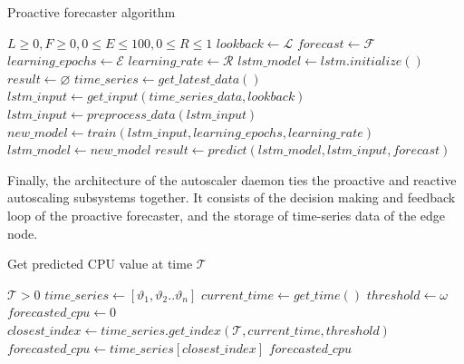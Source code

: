 \begin{algorithm}
    \caption{Proactive forecaster algorithm}
    \label{alg:proactive-forecast-alg}
    \begin{algorithmic}
        \Require $L \geq 0, F \geq 0, 0 \leq E \leq 100, 0 \leq R \leq 1$
        \State $lookback \gets \mathcal{L}$
        \State $forecast \gets \mathcal{F}$
        \State $learning\_epochs \gets \mathcal{E}$
        \State $learning\_rate \gets \mathcal{R}$
        \State $lstm\_model \gets lstm.initialize()$
        \State $result \gets \varnothing$
            \State $time\_series \gets get\_latest\_data()$
            \State $lstm\_input \gets get\_input(time\_series\_data, lookback)$
            \State $lstm\_input \gets preprocess\_data(lstm\_input)$
            \State $new\_model \gets train(lstm\_input, learning\_epochs, learning\_rate)$
                \State $lstm\_model \gets new\_model$
            \EndIf
            \State $result \gets predict(lstm\_model, lstm\_input, forecast)$
            \State {}
        \EndWhile
    \end{algorithmic}
\end{algorithm}

Finally, the architecture of the autoscaler daemon ties the proactive and reactive autoscaling subsystems together. It consists of the decision making and feedback loop of the proactive forecaster, and the storage of time-series data of the edge node.\par

\begin{algorithm}
    \caption{Get predicted CPU value at time $\mathcal{T}$}
    \label{alg:get-forecast-value}
    \begin{algorithmic}
        \Require $\mathcal{T} > 0$
        \State $time\_series \gets [ \vartheta_1, \vartheta_2 .. \vartheta_n ]$
        \State $current\_time \gets get\_time()$
        \State $threshold \gets \omega$
        \State $forecasted\_cpu \gets 0$
        \State $closest\_index \gets time\_series.get\_index(\mathcal{T}, current\_time, threshold)$
            \State $forecasted\_cpu \gets time\_series[closest\_index]$
        \EndIf
        \State \Return $forecasted\_cpu$
    \end{algorithmic}
\end{algorithm}


